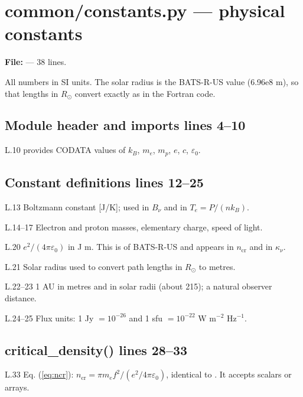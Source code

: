 \chapter{common/constants.py --- physical constants}
\label{mod:common:constants.py}
\textbf{File:}  --- 38 lines.

All numbers in SI units. The solar radius is the BATS-R-US value (6.96e8 m), so that
lengths in $R_\odot$ convert exactly as in the Fortran code.

\section*{\normalsize Module header and imports \hfill{\small\mdseries\color{gray}lines 4--10}}

\begin{lines}
\item[L.10]  provides CODATA values of $k_B$, $m_e$, $m_p$, $e$, $c$, $\varepsilon_0$.
\end{lines}
\section*{\normalsize Constant definitions \hfill{\small\mdseries\color{gray}lines 12--25}}

\begin{lines}
\item[L.13] Boltzmann constant [J/K]; used in $B_\nu$ and in $T_e=P/(n k_B)$.
\item[L.14–17] Electron and proton masses, elementary charge, speed of light.
\item[L.20] $e^2/(4\pi\varepsilon_0)$ in J m. This is  of BATS-R-US and appears in $n_\text{cr}$ and in $\kappa_\nu$.
\item[L.21] Solar radius used to convert path lengths in $R_\odot$ to metres.
\item[L.22–23] 1 AU in metres and in solar radii (about 215); a natural observer distance.
\item[L.24–25] Flux units: 1 Jy $=10^{-26}$ and 1 sfu $=10^{-22}$ W m$^{-2}$ Hz$^{-1}$.
\end{lines}
\section*{\normalsize critical\_density() \hfill{\small\mdseries\color{gray}lines 28--33}}

\begin{lines}
\item[L.33] Eq. (\ref{eq:ncr}): $n_\text{cr}=\pi m_e f^2/(e^2/4\pi\varepsilon_0)$, identical to . It accepts scalars or arrays.
\end{lines}
